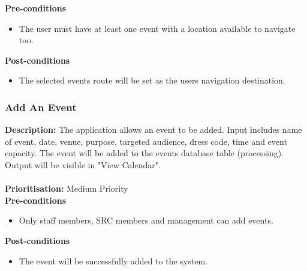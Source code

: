 \documentclass[runningheads,a4paper]{article}
\begin{document}
  
\textbf{Pre-conditions}
\begin{itemize}
	\item The user must have at least one event with a location available to navigate too.
\end{itemize}
  
\textbf{Post-conditions}
\begin{itemize}
  	\item The selected events route will be set as the users navigation destination.
\end{itemize}

\subsubsection{Add An Event}

\textbf{Description:} The application allows an event to be added. Input includes name of event, date, venue, purpose, targeted audience, dress code, time and event capacity. The event will be added to the events database table (processing). Output will be visible in "View Calendar".\\\\
\noindent
\textbf{Prioritisation:} Medium Priority\\
  
  
\textbf{Pre-conditions}
\begin{itemize}
	\item Only staff members, SRC members and management can add events.
\end{itemize}
  
\textbf{Post-conditions}
\begin{itemize}
  	\item The event will be successfully added to the system.
\end{itemize}
\end{document}
